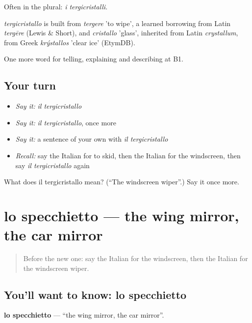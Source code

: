 Often in the plural: \emph{i tergicristalli}.

\begin{cousinweb}
\emph{tergicristallo} is built from \emph{tergere} 'to wipe', a learned borrowing from Latin \emph{tergēre} (Lewis \& Short), and \emph{cristallo} 'glass', inherited from Latin \emph{crystallum}, from Greek \emph{krýstallos} 'clear ice' (EtymDB).
\end{cousinweb}

\begin{grammarlens}[title={What you've built}]
One more word for telling, explaining and describing at B1.
\end{grammarlens}

\subsection*{Your turn}
\begin{itemize}
\raggedright
  \item \emph{Say it:} \emph{il tergicristallo}
  \item \emph{Say it:} \emph{il tergicristallo}, once more
  \item \emph{Say it:} a sentence of your own with \emph{il tergicristallo}
  \item \emph{Recall:} say the Italian for to skid, then the Italian for the windscreen, then say \emph{il tergicristallo} again
\end{itemize}

\begin{tcolorbox}[breakable,colback=teal!4,colframe=teal!35!black,title={Before you move on}]
What does il tergicristallo mean? (\textquotedblleft{}The windscreen wiper\textquotedblright{}.) Say it once more.
\end{tcolorbox}
\section[lo specchietto]{lo specchietto — the wing mirror, the car mirror}

\label{lesson:IT-C407-specchietto}



\begin{quote}
Before the new one: say the Italian for the windscreen, then the Italian for the windscreen wiper.
\end{quote}

\subsection*{You'll want to know: lo specchietto}
\textbf{lo specchietto} — \textquotedblleft{}the wing mirror, the car mirror\textquotedblright{}.

